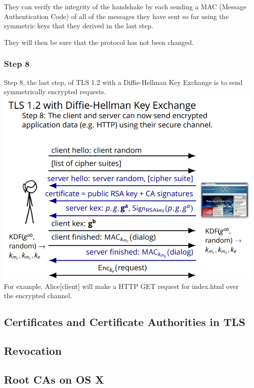 \documentclass[11pt]{article} %
\begin{document}
They can verify the integrity of the handshake by each sending a MAC (Message 
Authentication Code) of all of the messages they have sent so far using the 
symmetric keys that they derived in the last step.

They will then be sure that the protocol has not been changed.

\newpage
\subsubsection{Step 8}
Step 8, the last step, of TLS 1.2 with a Diffie-Hellman Key Exchange is to 
send symmetrically encrypted requests. \\

\includegraphics[scale=1.2]{./DiffieStep8.png}
\\

For example, Alice[client] will make a HTTP GET request for index.html over 
the encrypted channel.

\newpage
\subsection{Certificates and Certificate Authorities in TLS}

\subsection{Revocation}

\subsection{Root CAs on OS X}
\end{document}
